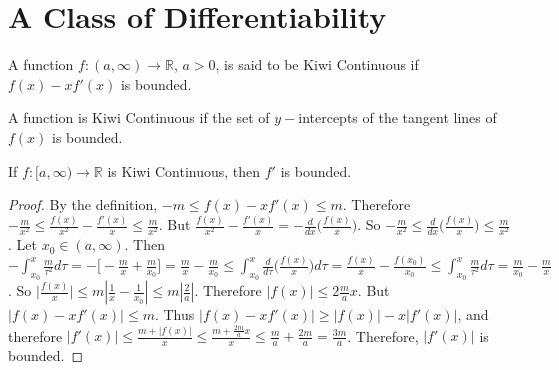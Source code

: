     \section{A Class of Differentiability}
        \begin{definition}
            A function $f:(a,\infty)\rightarrow \mathbb{R}$, $a>0$, is said to be Kiwi Continuous if $f(x)-xf'(x)$ is bounded.
        \end{definition}
        A function is Kiwi Continuous if the set of $y-$intercepts of the tangent lines of $f(x)$ is bounded.
        \begin{theorem}
            If $f:[a,\infty)\rightarrow \mathbb{R}$ is Kiwi Continuous, then $f'$ is bounded.
        \end{theorem}
        \begin{proof}
            By the definition, $-m \leq f(x)-xf'(x)\leq m$. Therefore $-\frac{m}{x^2} \leq \frac{f(x)}{x^2}- \frac{f'(x)}{x} \leq \frac{m}{x^2}$. But $\frac{f(x)}{x^2} - \frac{f'(x)}{x} = -\frac{d}{dx}\big(\frac{f(x)}{x}\big)$. So $-\frac{m}{x^2} \leq \frac{d}{dx}\big(\frac{f(x)}{x}\big) \leq \frac{m}{x^2}$. Let $x_0 \in (a,\infty)$. Then $-\int_{x_0}^x \frac{m}{\tau^2}d\tau = -\big[-\frac{m}{x}+ \frac{m}{x_0}\big] = \frac{m}{x}- \frac{m}{x_0} \leq \int_{x_0}^{x}\frac{d}{d\tau}\big(\frac{f(x)}{x}\big)d\tau = \frac{f(x)}{x} - \frac{f(x_0)}{x_0} \leq \int_{x_0}^{x} \frac{m}{\tau^2}d\tau = \frac{m}{x_0} - \frac{m}{x}$. So $\big|\frac{f(x)}{x}\big| \leq m|\frac{1}{x} - \frac{1}{x_0}| \leq m|\frac{2}{a}|$. Therefore $|f(x)| \leq 2\frac{m}{a}x$. But $|f(x) - xf'(x)| \leq m$. Thus $|f(x)-xf'(x)| \geq |f(x)| - x|f'(x)|$, and therefore $|f'(x)|  \leq \frac{m+|f(x)|}{x} \leq \frac{m+ \frac{2m}{a}x}{x} \leq \frac{m}{a} + \frac{2m}{a} = \frac{3m}{a}$. Therefore, $|f'(x)|$ is bounded.
        \end{proof}
